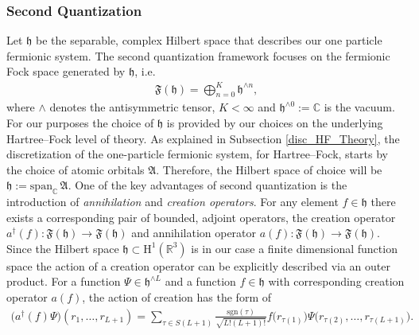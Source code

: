 \documentclass[reqno]{amsart}
\begin{document}
\subsubsection{Second Quantization}
Let $\mathfrak{h}$ be the separable, complex Hilbert space that describes our one particle fermionic system. The second quantization framework focuses on the fermionic Fock space generated by $\mathfrak{h}$, i.e.
\begin{align}
    \mathfrak{F}(\mathfrak{h})=\bigoplus_{n=0}^{K} \mathfrak{h}^{\wedge n},
\end{align}
where $\wedge$ denotes the antisymmetric tensor, $K< \infty$ and $\mathfrak{h}^{\wedge 0}:= \mathbb{C}$ is the vacuum. For our purposes the choice of $\mathfrak{h}$ is provided by our choices on the underlying Hartree–Fock level of theory. As explained in Subsection \ref{disc_HF_Theory}, the discretization of the one-particle fermionic system, for Hartree–Fock, starts by the choice of atomic orbitals $\mathfrak{A}$. Therefore, the Hilbert space of choice will be $\mathfrak{h}:=\text{span}_{\mathbb{C}}\,\mathfrak{A}$. One of the key advantages of second quantization is the introduction of \textit{annihilation} and \textit{creation operators}. For any element $f \in \mathfrak{h}$ there exists a corresponding pair of bounded, adjoint operators, the creation operator $a^{\dagger}(f):\mathfrak{F}(\mathfrak{h})\longrightarrow \mathfrak{F}(\mathfrak{h})$ and annihilation operator $a(f):\mathfrak{F}(\mathfrak{h})\longrightarrow \mathfrak{F}(\mathfrak{h})$. Since the Hilbert space $\mathfrak{h}\subset \mathrm{H}^1(\mathbb{R}^{3})$ is in our case a finite dimensional function space the action of a creation operator can be explicitly described via an outer product. For a function $\Psi\in \mathfrak{h}^{\wedge L}$ and a function $f\in \mathfrak{h}$ with corresponding creation operator $a(f)$, the action of creation has the form of
\begin{align}
    \big(a^{\dagger}(f)\Psi\big)(r_1,\ldots,r_{L+1})=\sum_{\tau \in S(L+1)}\frac{\text{sgn}(\tau)}{\sqrt{L!(L+1)!}}f\big(r_{\tau(1)}\big)\Psi\big(r_{\tau(2)},\ldots, r_{\tau(L+1)}\big).
\end{align}
\end{document}
